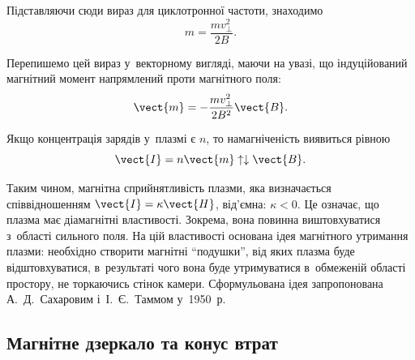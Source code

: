 Підставляючи сюди вираз для циклотронної частоти, знаходимо
\begin{equation*}
	m = \frac{mv_\perp^2}{2B}.
\end{equation*}

Перепишемо цей вираз у~векторному вигляді, маючи на увазі, що індуційований магнітний момент напрямлений проти магнітного поля:
\begin{equation*}
	\vect{m} = -\frac{mv_\perp^2}{2B^2}\vect{B}.
\end{equation*}

Якщо концентрація зарядів у~плазмі є $n$, то намагніченість виявиться рівною
\begin{equation*}
	\vect{I} = n\vect{m} \uparrow\downarrow \vect{B}.
\end{equation*}

Таким чином, магнітна сприйнятливість плазми, яка визначається співвідношенням $\vect{I} = \kappa\vect{H}$, від'ємна: $\kappa < 0$. Це означає, що плазма має діамагнітні властивості. Зокрема, вона повинна виштовхуватися з~області сильного поля. На цій властивості основана ідея магнітного утримання плазми: необхідно створити магнітні \enquote{подушки}, від яких плазма буде відштовхуватися, в~результаті чого вона буде утримуватися в~обмеженій області простору, не торкаючись стінок камери. Сформульована ідея запропонована А.~Д.~Сахаровим і~І.~Є.~Таммом у~1950~р.

\subsection{Магнітне дзеркало та конус втрат}

